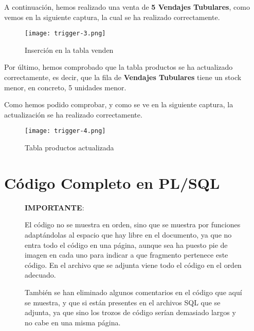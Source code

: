 \begin{enumerate}[label=\Alph*)]
    A continuación, hemos realizado una venta de  \textbf{5 Vendajes Tubulares}, como vemos en la siguiente captura, la cual se ha realizado correctamente.

        \begin{figure}[H]
        \centering
        \texttt{[image: trigger-3.png]}
        \caption{Inserción en la tabla venden}
    \end{figure}

    Por último, hemos comprobado que la tabla productos se ha actualizado correctamente, es decir, que la fila de \textbf{Vendajes Tubulares} tiene un stock menor, en concreto, 5 unidades menor.

    Como hemos podido comprobar, y como se ve en la siguiente captura, la actualización se ha realizado correctamente.

        \begin{figure}[H]
        \centering
        \texttt{[image: trigger-4.png]}
        \caption{Tabla productos actualizada}
    \end{figure}
\end{enumerate}

\section{Código Completo en PL/SQL}

\begin{figure}[H]
    \begin{tcolorbox}[sharp corners, colback=cyan!30, colframe=white!20]
\textbf{IMPORTANTE}:

El código no se muestra en orden, sino que se muestra por funciones adaptándolas
al espacio que hay libre en el documento, ya que no entra todo el código en una página,
aunque sea ha puesto pie de imagen en cada uno para indicar a que fragmento pertenece
este código. En el archivo que se adjunta viene todo el código en el orden adecuado.

También se han eliminado algunos comentarios en el código que aquí se muestra, y que
si están presentes en el archivos SQL que se adjunta, ya que sino los trozos de código
serían demasiado largos y no cabe en una misma página.
    \end{tcolorbox}
\end{figure}


